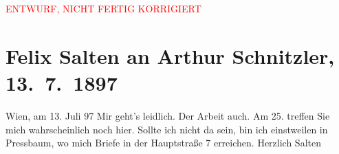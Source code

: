 
\begin{center}
            \textcolor{red}{ENTWURF, NICHT FERTIG KORRIGIERT}
                      \end{center}
            
         \renewcommand{\erwaehnteOrte}{Orte: Hauptstraße, Pressbaum, Wien}
         \renewcommand{\erwaehnteWerke}{}
               \section[Felix Salten an Arthur Schnitzler, 13. 7. 1897]{ Felix Salten an Arthur Schnitzler, 13. 7. 1897}\nopagebreak{}\rehead{ }\begin{ledgroupsized}[t]{13cm}\normalsize\beginnumbering \toendnotes[C]{\smallbreak\pagebreak[2]} 
\pstart
           \raggedleft{}{\pb}Wien, am 13. Juli 97\pend
           \pstart
           Mir geht's leidlich. Der Arbeit auch.\pend
           \pstart
           Am 25. treffen Sie mich wahrscheinlich noch hier. Sollte ich nicht da
               sein, bin ich einstweilen in Pressbaum, wo mich Briefe
               in der Hauptstraße 7 erreichen.\pend
           \pstart Herzlich \spacefill\mbox{Salten}\pend{}
         
         \endnumbering{}\end{ledgroupsized}\begin{anhang}\end{anhang}\newcommand{\dateiname}{L03268}\newcommand{\titel}{Felix Salten an Arthur Schnitzler, 13. 7. 1897}\newcommand{\editorInnen}{Martin Anton Müller und Laura Untner}
      